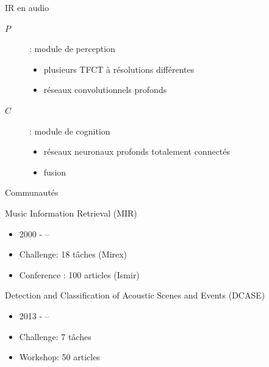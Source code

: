 \begin{frame}{IR en audio}
\begin{center}
\end{center}
\vspace{.8cm}
\begin{description}
\item[$P$]: module de \og perception \fg
\begin{itemize}
    \item plusieurs TFCT à résolutions différentes
    \item réseaux convolutionnels profonds
\end{itemize}
\item[$C$]: module de \og cognition \fg
\begin{itemize}
    \item réseaux neuronaux profonds totalement connectés
    \item fusion
\end{itemize}
\end{description}
\end{frame}


\begin{frame}{Communautés}
\begin{block}{Music Information Retrieval (MIR)}
\begin{itemize}
\item 2000 - --
\item Challenge: 18 tâches  (Mirex)
\item Conference : 100 articles (Ismir)
\end{itemize}
\end{block}
\begin{block}{Detection and Classification of
Acoustic Scenes and Events (DCASE)}
\begin{itemize}
\item 2013 - --
\item Challenge: 7 tâches
\item Workshop: 50 articles
\end{itemize}
\end{block}
\end{frame}



